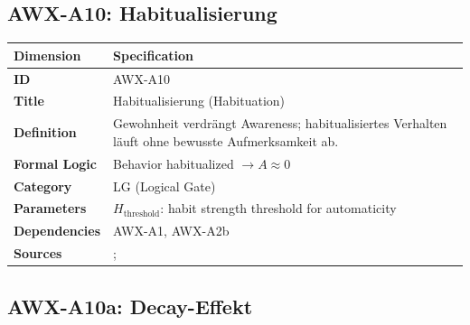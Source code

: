 
\subsection{AWX-A10: Habitualisierung}

\begin{table}[htbp]
\small
\begin{tabular}{p{3cm}p{11cm}}
\toprule
\textbf{Dimension} & \textbf{Specification} \\
\midrule
\textbf{ID} & AWX-A10 \\
\textbf{Title} & Habitualisierung (Habituation) \\
\textbf{Definition} & Gewohnheit verdrängt Awareness; habitualisiertes Verhalten läuft ohne bewusste Aufmerksamkeit ab. \\
\textbf{Formal Logic} & Behavior habitualized $\rightarrow A \approx 0$ \\
\textbf{Category} & LG (Logical Gate) \\
\textbf{Parameters} & $H_{\text{threshold}}$: habit strength threshold for automaticity \\
\textbf{Dependencies} & AWX-A1, AWX-A2b \\
\textbf{Sources} & \citet{wood2016psychology}; \citet{ouellette1998habit} \\
\bottomrule
\end{tabular}
\end{table}


\subsection{AWX-A10a: Decay-Effekt}

